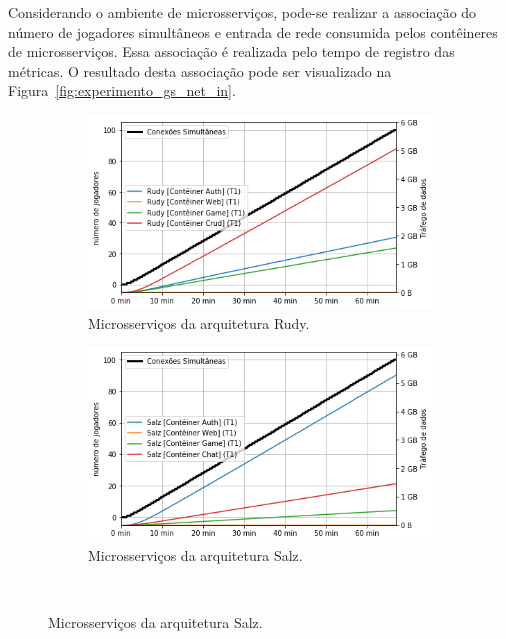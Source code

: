 Considerando o ambiente de microsserviços, pode-se realizar a associação do número de jogadores simultâneos e entrada de rede consumida pelos contêineres de microsserviços.
%
Essa associação é realizada pelo tempo de registro das métricas.
%
O resultado desta associação pode ser visualizado na Figura~\ref{fig:experimento_gs_net_in}.
\pagebreak
\begin{figure}[htb!]
    \caption{Entrada de dados da rede de microsserviços.}
    \label{fig:experimento_gs_net_in}

    \begin{subfigure}{0.5\textwidth}
        \centering
        \includegraphics[width=.95\linewidth]{figuras/analise/rt/r_net_in_arch.png}
        \caption{Microsserviços da arquitetura Rudy.}
        \label{fig:r_netin_gs}
    \end{subfigure}%
    \begin{subfigure}{0.5\textwidth}
        \centering
        \includegraphics[width=.95\linewidth]{figuras/analise/rt/s_net_in_arch.png}
        \caption{Microsserviços da arquitetura Salz.}
        \label{fig:s_netin_gs}
    \end{subfigure}\\


\end{figure}

